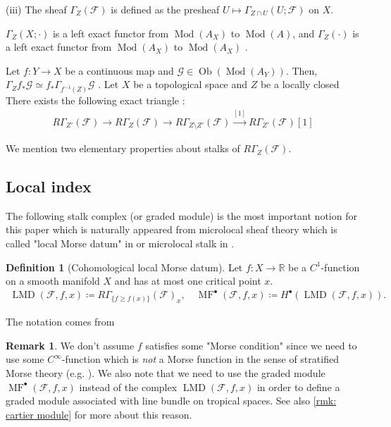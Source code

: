 \documentclass[a4paper,dvipdfmx,reqno,12pt]{amsart}
\theoremstyle{definition}
\newtheorem{Def}[Thm]{Definition}
\newtheorem{Rmk}[Thm]{Remark}
\newcommand{\deq}{\coloneqq}
\newcommand{\R}{\mathbb{R}}%
\newcommand{\mcal}[1]{\mathcal{#1}}%
\newcommand{\opn}[1]{\operatorname{#1}}
\newcommand{\xto}[1]{\xrightarrow{#1}}
\numberwithin{equation}{section}
\begin{document}
(iii) The sheaf $\Gamma_{Z}(\mcal{F})$ is defined as the presheaf 
$U\mapsto \Gamma_{Z\cap U}(U;\mcal{F})$ on $X$.

$\Gamma_Z(X;\cdot)$ is a left exact functor from 
$\opn{Mod}(A_X)$ to $\opn{Mod}(A)$,
and $\Gamma_{Z}(\cdot)$ is a left exact functor from
$\opn{Mod}(A_X)$ to $\opn{Mod}(A_X)$ 
\cite[Proposition 2.3.9 (i)]{MR1299726}.

Let $f\colon Y\to X$ be a continuous map and 
$\mcal{G}\in\opn{Ob}(\opn{Mod}(A_Y))$.
Then, $\Gamma_Zf_*\mcal{G}\simeq f_*\Gamma_{f^{-1}(Z)}\mcal{G}$
\cite[(2.3.20)]{MR1299726}.
Let $X$ be a topological space and $Z$ be a locally closed
There exists the following exact triangle 
\cite[(2.6.32)]{MR1299726}:
\begin{align} \label{eq: exactlocal}
  R\Gamma_{Z'}(\mcal{F})\to R\Gamma_{Z}(\mcal{F})\to 
R\Gamma_{Z\setminus Z'}(\mcal{F})\xto{[1]} R\Gamma_{Z'}(\mcal{F})[1]
\end{align}



We mention two elementary properties 
about stalks of $R\Gamma_{Z}(\mcal{F})$.

\subsection{Local index}

The following stalk complex (or graded module) is 
the most important notion
for this paper which is naturally appeared from 
microlocal sheaf theory 
which is called "local Morse datum" in \cite[p.271]{MR2031639} 
or microlocal stalk in \cite{MR4132582}.
\begin{Def}[{Cohomological local Morse datum}]
Let $f\colon X\to \R$ be a $C^{1}$-function on a smooth manifold $X$ and has 
at most one critical point $x$.
\begin{align}
\opn{LMD}(\mcal{F},f,x)\deq R\Gamma_{\{f\geq f(x)\}}
(\mcal{F})_x, \quad \opn{MF}^{\bullet}(\mcal{F},f,x)\deq 
H^{\bullet}(\opn{LMD}(\mcal{F},f,x)).
\end{align}
\end{Def}
The notation comes from \cite[p.271]{MR2031639}
\begin{Rmk}
We don't assume $f$ satisfies some 
"Morse condition" since
 we need to use some $C^{\infty}$-function
which is \emph{not} a Morse function in the sense of 
stratified Morse theory (e.g. \cite[Part 1.2.1]{MR932724}). 
We also note that we need to use 
the graded module $\opn{MF}^{\bullet}(\mcal{F},f,x)$ instead of 
the complex $\opn{LMD}(\mcal{F},f,x)$ in order to define
a graded module associated with line bundle on tropical
spaces. See also \cref{rmk: cartier module} for more about 
this reason.
\end{Rmk}
\end{document}
